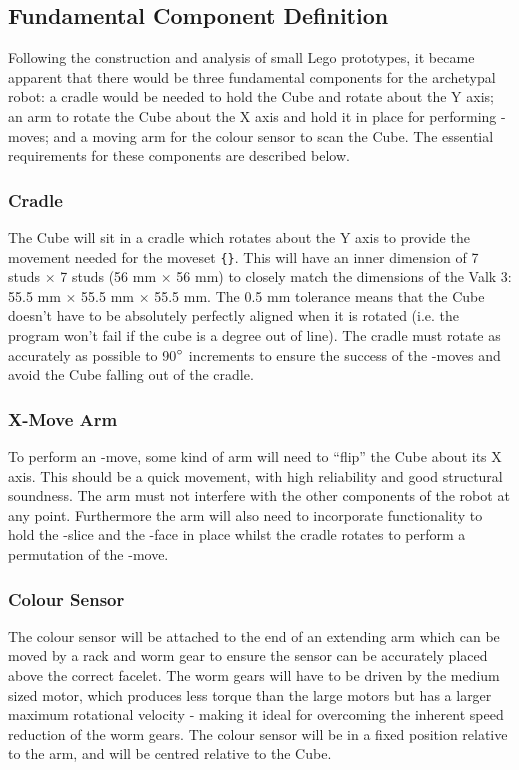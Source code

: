 \documentclass{report}
\newcommand{\moveset}[1]{\uppercase{\texttt{\{\formatmoves{#1}\}}}}
\newcommand{\face}[1]{\uppercase{\texttt{\formatmovesnospace{#1}}}-face}
\newcommand{\move}[1]{\uppercase{\texttt{\formatmovesnospace{#1}}}-move}
\newcommand{\slice}[1]{\uppercase{\texttt{\formatmovesnospace{#1}}}-slice}
\begin{document}
    \subsection{Fundamental Component Definition}
    
    Following the construction and analysis of small Lego prototypes, it became apparent that there would be three fundamental components for the archetypal robot: a cradle would be needed to hold the Cube and rotate about the Y axis; an arm to rotate the Cube about the X axis and hold it in place for performing \move{d}s; and a moving arm for the colour sensor to scan the Cube. The essential requirements for these components are described below.
    
    \subsubsection{Cradle}
    
    The Cube will sit in a cradle which rotates about the Y axis to provide the movement needed for the moveset \moveset{Y.Y'y2D.D'd2}. This will have an inner dimension of 7 studs $\times$ 7 studs (56 \si{\milli\metre} $\times$ 56 \si{\milli\metre}) to closely match the dimensions of the Valk 3: 55.5 \si{\milli\metre} $\times$ 55.5 \si{\milli\metre} $\times$ 55.5 \si{\milli\metre}. The 0.5 \si{\milli\metre} tolerance means that the Cube doesn't have to be absolutely perfectly aligned when it is rotated (i.e. the program won't fail if the cube is a degree out of line). The cradle must rotate as accurately as possible to 90$\degree$ increments to ensure the success of the \move{x}s and avoid the Cube falling out of the cradle. 
    
    \subsubsection{X-Move Arm}
    To perform an \move{x}, some kind of arm will need to \enquote{flip} the Cube about its X axis. This should be a quick movement, with high reliability and good structural soundness. The arm must not interfere with the other components of the robot at any point. Furthermore the arm will also need to incorporate functionality to hold the \slice{l-r} and the \face{u} in place whilst the cradle rotates to perform a permutation of the \move{d}.
    
    \subsubsection{Colour Sensor}
    The colour sensor will be attached to the end of an extending arm which can be moved by a rack and worm gear to ensure the sensor can be accurately placed above the correct facelet. The worm gears will have to be driven by the medium sized motor, which produces less torque than the large motors but has a larger maximum rotational velocity - making it ideal for overcoming the inherent speed reduction of the worm gears. The colour sensor will be in a fixed position relative to the arm, and will be centred relative to the Cube.
    
\end{document}
